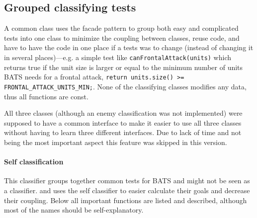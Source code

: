 \subsection{Grouped classifying tests}
A common class uses the facade pattern to group both easy and complicated tests into one class to minimize the coupling between classes, reuse code, and have to have the code in one place if a tests was to change (instead of changing it in several places)—e.g. a simple test like \texttt{canFrontalAttack(units)} which returns true if the unit size is larger or equal to the minimum number of units BATS needs for a frontal attack, \texttt{\justify return units.size() >= FRONTAL\_ATTACK\_UNITS\_MIN;}. None of the classifying classes modifies any data, thus all functions are const.

All three classes (although an enemy classification was not implemented) were supposed to have a common interface to make it easier to use all three classes without having to learn three different interfaces. Due to lack of time and not being the most important aspect this feature was skipped in this version.

\paragraph{Self classification}
This classifier groups together common tests for BATS and might not be seen as a classifier.  and  uses the self classifier to easier calculate their goals and decrease their coupling. Below all important functions are listed and described, although most of the names should be self-explanatory.

